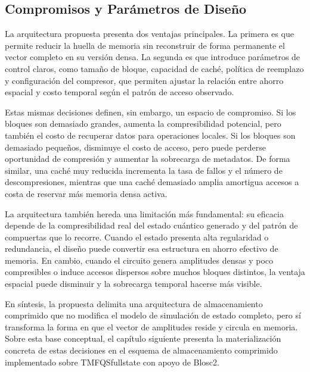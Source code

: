 \subsection{Compromisos y Parámetros de Diseño}

La arquitectura propuesta presenta dos ventajas principales. La primera es que permite reducir la huella de memoria sin reconstruir de forma
permanente el vector completo en su versión densa. La segunda es que introduce parámetros de control claros, como tamaño de bloque, capacidad de
caché, política de reemplazo y configuración del compresor, que permiten ajustar la relación entre ahorro espacial y costo temporal según el
patrón de acceso observado.

Estas mismas decisiones definen, sin embargo, un espacio de compromiso. Si los bloques son demasiado grandes, aumenta la compresibilidad
potencial, pero también el costo de recuperar datos para operaciones locales. Si los bloques son demasiado pequeños, disminuye el costo de acceso,
pero puede perderse oportunidad de compresión y aumentar la sobrecarga de metadatos. De forma similar, una caché muy reducida incrementa la tasa
de fallos y el número de descompresiones, mientras que una caché demasiado amplia amortigua accesos a costa de reservar más memoria densa activa.

La arquitectura también hereda una limitación más fundamental: su eficacia depende de la compresibilidad real del estado cuántico generado y del
patrón de compuertas que lo recorre. Cuando el estado presenta alta regularidad o redundancia, el diseño puede convertir esa estructura en ahorro
efectivo de memoria. En cambio, cuando el circuito genera amplitudes densas y poco compresibles o induce accesos dispersos sobre muchos bloques
distintos, la ventaja espacial puede disminuir y la sobrecarga temporal hacerse más visible.

En síntesis, la propuesta delimita una arquitectura de almacenamiento comprimido que no modifica el modelo de simulación de estado completo, pero
sí transforma la forma en que el vector de amplitudes reside y circula en memoria. Sobre esta base conceptual, el capítulo siguiente presenta la
materialización concreta de estas decisiones en el esquema de almacenamiento comprimido implementado sobre TMFQSfullstate con apoyo de Blosc2.
